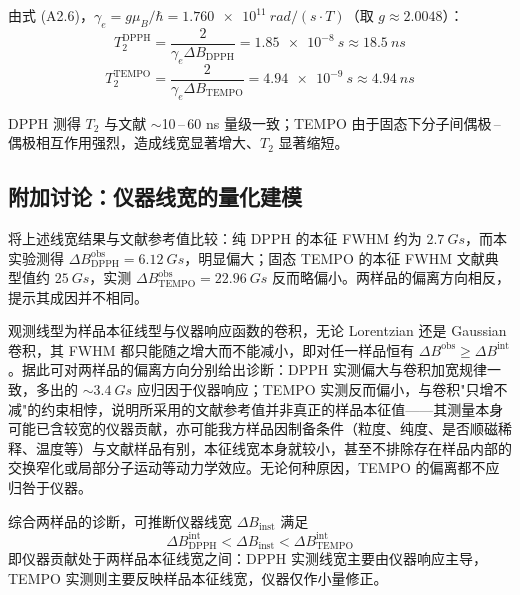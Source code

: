 \documentclass[a4paper,8pt,twocolumn]{article}
\begin{document}
由式 (A2.6)，$\gamma_e=g\mu_B/\hbar=\SI{1.760e11}{rad/(s\cdot T)}$（取 $g\approx 2.0048$）：
\begin{equation*}
T_2^{\text{DPPH}}=\frac{2}{\gamma_e\Delta B_{\text{DPPH}}}=\SI{1.85e-8}{s}\approx\SI{18.5}{ns}
\end{equation*}
\begin{equation*}
T_2^{\text{TEMPO}}=\frac{2}{\gamma_e\Delta B_{\text{TEMPO}}}=\SI{4.94e-9}{s}\approx\SI{4.94}{ns}
\end{equation*}

DPPH 测得 $T_2$ 与文献 $\sim$10\,--\,60 ns 量级一致；TEMPO 由于固态下分子间偶极\,--\,偶极相互作用强烈，造成线宽显著增大、$T_2$ 显著缩短。

\subsection{附加讨论：仪器线宽的量化建模}

将上述线宽结果与文献参考值比较：纯 DPPH 的本征 FWHM 约为 $\SI{2.7}{Gs}$，而本实验测得 $\Delta B_{\text{DPPH}}^{\text{obs}}=\SI{6.12}{Gs}$，明显偏大；固态 TEMPO 的本征 FWHM 文献典型值约 $\SI{25}{Gs}$，实测 $\Delta B_{\text{TEMPO}}^{\text{obs}}=\SI{22.96}{Gs}$ 反而略偏小。两样品的偏离方向相反，提示其成因并不相同。

观测线型为样品本征线型与仪器响应函数的卷积，无论 Lorentzian 还是 Gaussian 卷积，其 FWHM 都只能随之增大而不能减小，即对任一样品恒有 $\Delta B^{\text{obs}}\geq \Delta B^{\text{int}}$。据此可对两样品的偏离方向分别给出诊断：DPPH 实测偏大与卷积加宽规律一致，多出的 $\sim\SI{3.4}{Gs}$ 应归因于仪器响应；TEMPO 实测反而偏小，与卷积"只增不减"的约束相悖，说明所采用的文献参考值并非真正的样品本征值——其测量本身可能已含较宽的仪器贡献，亦可能我方样品因制备条件（粒度、纯度、是否顺磁稀释、温度等）与文献样品有别，本征线宽本身就较小，甚至不排除存在样品内部的交换窄化或局部分子运动等动力学效应。无论何种原因，TEMPO 的偏离都不应归咎于仪器。

综合两样品的诊断，可推断仪器线宽 $\Delta B_{\text{inst}}$ 满足
\begin{equation*}
  \Delta B_{\text{DPPH}}^{\text{int}}<\Delta B_{\text{inst}}<\Delta B_{\text{TEMPO}}^{\text{int}}
\end{equation*}
即仪器贡献处于两样品本征线宽之间：DPPH 实测线宽主要由仪器响应主导，TEMPO 实测则主要反映样品本征线宽，仪器仅作小量修正。
\end{document}
